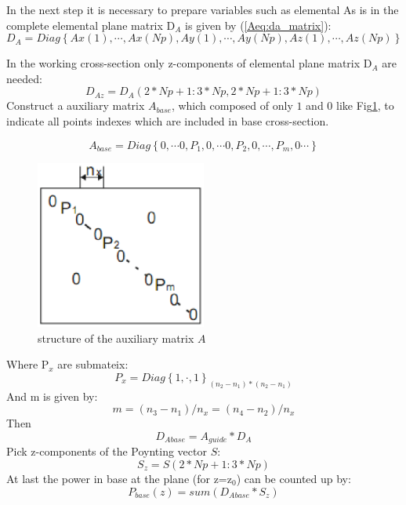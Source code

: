 In the next step it is necessary to prepare variables such as elemental 
As is in \cite{script_FeldSim} the complete elemental plane matrix D$_{A}$ is given by (\ref{Aeq:da_matrix}): 
\begin{equation}
D_{A}=Diag\left\{Ax(1),\cdots,Ax(Np),Ay(1),\cdots,Ay(Np), Az(1),\cdots,Az(Np)\right\}
\label{Aeq:da_matrix}
\end{equation}

In the working cross-section only z-components of elemental plane matrix D$_{A}$ are needed:
\begin{equation}
D_{Az}=D_{A}(2*Np+1:3*Np, 2*Np+1:3*Np)
\label{Aeq:daz_matrix}
\end{equation}
Construct a auxiliary matrix $A_{base}$, which composed of only $1$ and $0$ like Fig\quad\ref{Afig:app_Auxiliary_matrix}, to indicate all points indexes which are included in base cross-section. 

\begin{equation}
A_{base}=Diag\left\{0,\cdots 0,P_{1},0,\cdots 0, P_{2}, 0,\cdots, P_{m}, 0\cdots\right\}
\label{Aeq:A_matrix}
\end{equation}

\begin{figure}[ht]
\centering
\includegraphics[width=0.5\textwidth]{bilder/app_Auxiliary_matrix}
\caption{structure of the auxiliary matrix $A$}
\label{Afig:app_Auxiliary_matrix}
\end{figure}
Where P$_{x}$ are submateix:
\begin{equation}
P_{x}=Diag\left\{1,\cdot,1\right\}_{(n_{2}-n_{1})*(n_{2}-n_{1})}
\end{equation}
And m is given by:
\begin{equation}
m=(n_{3}-n_{1})/n_{x}=(n_{4}-n_{2})/n_{x}
\end{equation}
Then 
\begin{equation}
D_{Abase}=A_{guide}*D_{A}
\end{equation}
Pick z-components of the Poynting vector $S$:
\begin{equation}
S_{z}=S(2*Np+1:3*Np)
\end{equation}
At last the power in base at the plane (for z=z$_{0}$) can be counted up by:
\begin{equation}
P_{base}(z)=sum(D_{Abase}*S_{z})
\end{equation}

